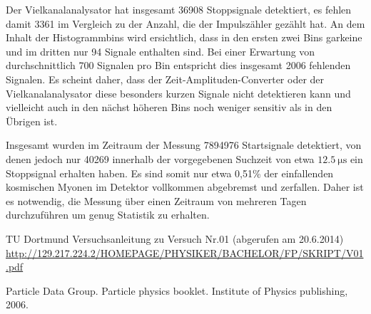 Der Vielkanalanalysator hat insgesamt 36908 Stoppsignale detektiert, es fehlen damit 3361 im Vergleich zu der Anzahl, die der Impulszähler gezählt hat. An dem Inhalt der Histogrammbins wird ersichtlich, dass in den ersten zwei Bins garkeine und im dritten nur 94 Signale enthalten sind. Bei einer Erwartung von durchschnittlich 700 Signalen pro Bin entspricht dies insgesamt 2006 fehlenden Signalen. Es scheint daher, dass der Zeit-Amplituden-Converter oder der Vielkanalanalysator diese besonders kurzen Signale nicht detektieren kann und vielleicht auch in den nächst höheren Bins noch weniger sensitiv als in den Übrigen ist.

Insgesamt wurden im Zeitraum der Messung 7894976 Startsignale detektiert, von denen jedoch nur 40269 innerhalb der vorgegebenen Suchzeit von etwa $\SI{12,5}{\micro\second}$ ein Stoppsignal erhalten haben. Es sind somit nur etwa 0,51\% der einfallenden kosmischen Myonen im Detektor vollkommen abgebremst und zerfallen. Daher ist es notwendig, die Messung über einen Zeitraum von mehreren Tagen durchzuführen um genug Statistik zu erhalten.

\vfill
\begin{thebibliography}{WissOnl}
 TU Dortmund Versuchsanleitung zu Versuch Nr.01 (abgerufen am 20.6.2014) \url{http://129.217.224.2/HOMEPAGE/PHYSIKER/BACHELOR/FP/SKRIPT/V01.pdf}

 Particle Data Group. Particle physics booklet. Institute of Physics publishing, 2006.

\end{thebibliography}

